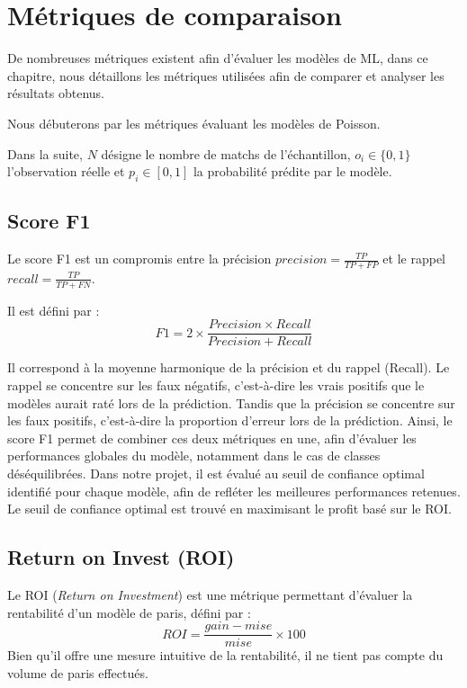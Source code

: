 \section{Métriques de comparaison}
\label{chap:métriques}
De nombreuses métriques existent afin d'évaluer les modèles de ML, 
dans ce chapitre, nous détaillons les métriques utilisées afin de 
comparer et analyser les résultats obtenus.

\noindent Nous débuterons par les métriques évaluant les modèles de Poisson.


\vspace*{1cm}
\noindent Dans la suite, $N$ désigne le nombre de matchs de l'échantillon, $o_i \in \{0, 1\}$ 
l'observation réelle et $p_i \in [0, 1]$ la probabilité prédite par le modèle.

\subsection{Score F1}
\label{sec:f1}
Le score F1 est un compromis entre la précision
$precision = \frac{TP}{TP + FP}$ et le rappel
$recall = \frac{TP}{TP + FN}$.

Il est défini par :
\[
F1 = 2 \times \frac{Precision \times Recall}{Precision + Recall}
\]

\noindent Il correspond à la moyenne harmonique de la précision et du rappel (Recall).  
Le rappel se concentre sur les faux négatifs, c'est-à-dire les vrais positifs que le modèles 
aurait raté lors de la prédiction. Tandis que la précision se concentre sur 
les faux positifs, c'est-à-dire la proportion d'erreur lors de la prédiction. 
Ainsi, le score F1 permet de combiner ces deux métriques en une, 
afin d'évaluer les performances globales du modèle, notamment dans le cas de 
classes déséquilibrées.
Dans notre projet, il est évalué au seuil de confiance optimal 
identifié pour chaque modèle, afin de refléter les meilleures performances retenues.
Le seuil de confiance optimal est trouvé en maximisant le profit basé sur le ROI.

\subsection{Return on Invest (ROI)}
\label{sec:roi}
Le ROI (\textit{Return on Investment}) est une métrique permettant d'évaluer la 
rentabilité d'un modèle de paris, défini par :
\[
ROI = \frac{gain - mise}{mise} \times 100
\]
Bien qu'il offre une mesure intuitive de la rentabilité, il ne tient pas compte 
du volume de paris effectués.

